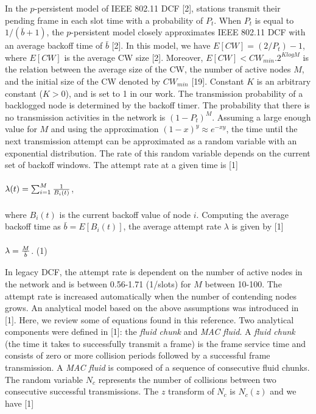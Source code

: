 \documentclass[10pt,twocolumn,oneside,submit]{JCNtran}
\begin{document}
In the $p$-persistent model of IEEE 802.11 DCF [2], stations transmit their pending frame in each slot time with a probability of $P_t$. When $P_t$ is equal to $1/(\bar{b}+1)$, the $p$-persistent model closely approximates IEEE 802.11 DCF with an average backoff time of $\bar b$ [2]. In this model, we have $E[CW]=(2/P_t)-1$, where $E[CW]$ is the average CW size [2]. Moreover, $E[CW]<CW_{min}.2^{KlogM}$ is the relation between the average size of the CW, the number of active nodes $M$, and the initial size of the CW denoted by $CW_{min}$ [19]. Constant $K$ is an arbitrary constant ($K>0$), and is set to 1 in our work. The transmission probability of a backlogged node is determined by the backoff timer. The probability that there is no transmission activities in the network is $(1-P_t)^M$. Assuming a large enough value for $M$ and using the approximation $(1-x)^y\approx e^{-xy}$, the time until the next transmission attempt can be approximated as a random variable with an exponential distribution. The rate of this random variable depends on the current set of backoff windows. The attempt rate at a given time is [1]\\
\\
$\lambda (t)=\sum_{i=1}^M {1\over B_i(t)}$,\\
\\
where $B_i(t)$ is the current backoff value of node $i$. Computing the average backoff time as $\bar b=E[B_i(t)]$, the average attempt rate $\lambda $ is given by [1]\\
\\
$\lambda = {{M} \over {\bar b}}$. \hfill(1) \\
\par In legacy DCF, the attempt rate is dependent on the number of active nodes in the network and is between 0.56-1.71 (1/slots) for $M$ between 10-100. The attempt rate is increased automatically when the number of contending nodes grows. An analytical model based on the above assumptions was introduced in [1]. Here, we review some of equations found in this reference. Two analytical components were defined in [1]: the {\it fluid chunk} and {\it MAC fluid}. A {\it fluid chunk} (the time it takes to successfully transmit a frame) is the frame service time and consists of zero or more collision periods followed by a successful frame transmission. A {\it MAC fluid} is composed of a sequence of consecutive fluid chunks. The random variable $N_c$ represents the number of collisions between two consecutive successful transmissions. The $z$ transform of $N_c$ is $N_c(z)$ and we have [1]\\
\end{document}
